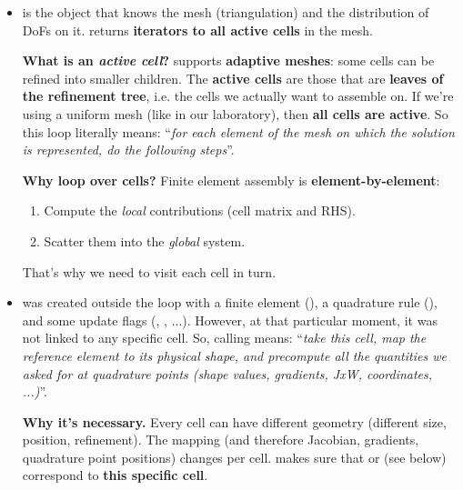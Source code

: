 \begin{itemize}
    \item {}  is the object that knows the mesh (triangulation) and the distribution of DoFs on it.  returns \textbf{iterators to all active cells} in the mesh.
    
    \textcolor{Green3}{ \textbf{What is an \emph{active cell}?}}  supports \textbf{adaptive meshes}: some cells can be refined into smaller children. The \textbf{active cells} are those that are \textbf{leaves of the refinement tree}, i.e. the cells we actually want to assemble on. If we're using a uniform mesh (like in our laboratory), then \textbf{all cells are active}. So this loop literally means: ``\emph{for each element of the mesh on which the solution is represented, do the following steps}''.

    \textcolor{Green3}{ \textbf{Why loop over cells?}} Finite element assembly is \textbf{element-by-element}:
    \begin{enumerate}
        \item Compute the \emph{local} contributions (cell matrix and RHS).
        \item Scatter them into the \emph{global} system.
    \end{enumerate}
    That's why we need to visit each cell in turn.


    \item {}  was created outside the loop with a finite element (), a quadrature rule (), and some update flags (, , ...). However, at that particular moment, it was not linked to any specific cell. So, calling  means: ``\emph{take this cell, map the reference element to its physical shape, and precompute all the quantities we asked for at quadrature points (shape values, gradients, JxW, coordinates, ...)}''.

    \textcolor{Green3}{ \textbf{Why it's necessary.}} Every cell can have different geometry (different size, position, refinement). The mapping (and therefore Jacobian, gradients, quadrature point positions) changes per cell.  makes sure that  or  (see below) correspond to \textbf{this specific cell}.



\end{itemize}
